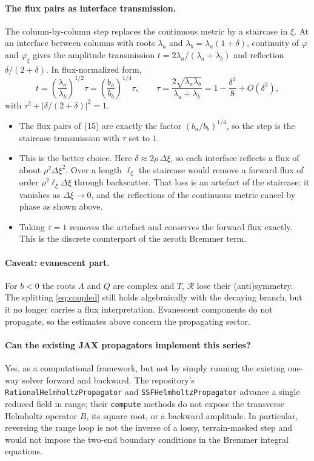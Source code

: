 \documentclass[11pt]{article}
\begin{document}
\paragraph{The flux pairs as interface transmission.} The column-by-column
step replaces the continuous metric by a staircase in $\xi$. At an interface
between columns with roots $\lambda_a$ and $\lambda_b=\lambda_a(1+\delta)$,
continuity of $\varphi$ and $\varphi_\xi$ gives the amplitude transmission
$t=2\lambda_a/(\lambda_a+\lambda_b)$ and reflection
$\delta/(2+\delta)$. In flux-normalized form,
\[
t=\left(\frac{\lambda_a}{\lambda_b}\right)^{1/2}\tau=\left(\frac{b_a}{b_b}\right)^{1/4}\tau,\qquad
\tau=\frac{2\sqrt{\lambda_a\lambda_b}}{\lambda_a+\lambda_b}=1-\frac{\delta^2}8+O(\delta^3),
\]
with $\tau^2+|\delta/(2+\delta)|^2=1$.
\begin{itemize}
\item The flux pairs of (15) are exactly the factor $(b_a/b_b)^{1/4}$, so the
  step is the staircase transmission with $\tau$ set to $1$.
\item This is the better choice. Here $\delta\approx2\rho\,\Delta\xi$, so each
  interface reflects a flux of about $\rho^2\Delta\xi^2$. Over a length
  $\ell_\xi$ the staircase would remove a forward flux of order
  $\rho^2\ell_\xi\Delta\xi$ through backscatter. That loss is an artefact of
  the staircase: it vanishes as $\Delta\xi\to0$, and the reflections of the
  continuous metric cancel by phase as shown above.
\item Taking $\tau=1$ removes the artefact and conserves the forward flux
  exactly. This is the discrete counterpart of the zeroth Bremmer term.
\end{itemize}

\paragraph{Caveat: evanescent part.} For $b<0$ the roots $\Lambda$ and $Q$ are
complex and $T$, $\mathcal R$ lose their (anti)symmetry. The splitting
\eqref{eq:coupled} still holds algebraically with the decaying branch, but it
no longer carries a flux interpretation. Evanescent components do not
propagate, so the estimates above concern the propagating sector.

\paragraph{Can the existing JAX propagators implement this series?}
Yes, as a computational framework, but not by simply running the existing
one-way solver forward and backward. The repository's
\texttt{RationalHelmholtzPropagator} and \texttt{SSFHelmholtzPropagator}
advance a single reduced field in range; their \texttt{compute} methods do
not expose the transverse Helmholtz operator $B$, its square root, or a
backward amplitude. In particular, reversing the range loop is not the
inverse of a lossy, terrain-masked step and would not impose the two-end
boundary conditions in the Bremmer integral equations.
\end{document}
